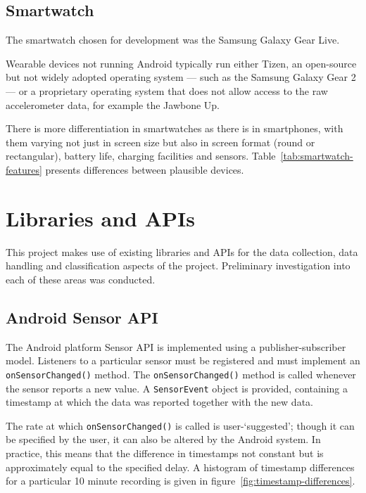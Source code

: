     \subsection{Smartwatch}
      The smartwatch chosen for development was the Samsung Galaxy Gear Live.
      
      Wearable devices not running Android typically run either Tizen, an open-source but not 
      widely adopted operating system --- such as the Samsung Galaxy Gear 2 --- or a proprietary 
      operating system that does not allow access to the raw accelerometer data, for example the 
      Jawbone Up. 
      
      There is more differentiation in smartwatches as there is in smartphones, with them varying
      not just in screen size but also in screen format (round or rectangular), battery life,
      charging facilities and sensors. Table~\ref{tab:smartwatch-features} presents differences
      between plausible devices.
    
  \section{Libraries and APIs}
      This project makes use of existing libraries and APIs for the data collection, data handling
      and classification aspects of the project. Preliminary investigation into each of these areas
      was conducted.
    
    \subsection{Android Sensor API}
      The Android platform Sensor API is implemented using a publisher-subscriber model. Listeners
      to a particular sensor must be registered and must implement an \texttt{onSensorChanged()}
      method. The \texttt{onSensorChanged()} method is called whenever the sensor reports a new 
      value. A \texttt{SensorEvent} object is provided, containing a timestamp at which the data was
      reported together with the new data.
      
      The rate at which \texttt{onSensorChanged()} is called is user-`suggested'; though it can be 
      specified by the user, it can also be altered by the Android system. In practice, this means
      that the difference in timestamps not constant but is approximately equal to the specified 
      delay. A histogram of timestamp differences for a particular 10 minute recording is given in 
      figure~\ref{fig:timestamp-differences}.
      
